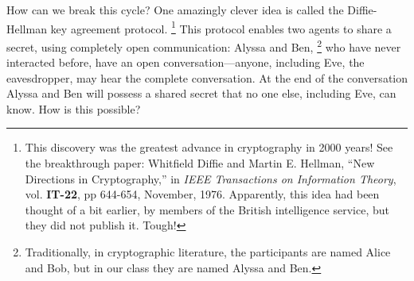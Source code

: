 How can we break this cycle? One amazingly clever idea is called the
Diffie-Hellman key agreement protocol.%
\footnote{This discovery was the greatest advance in cryptography in
  2000 years!  See the breakthrough paper:
  Whitfield Diffie and Martin E. Hellman, ``New Directions in
  Cryptography,'' in {\em IEEE Transactions on Information Theory},
  vol. {\bf IT-22}, pp 644-654, November, 1976.  Apparently, this idea
  had been thought of a bit earlier, by members of the British
  intelligence service, but they did not publish it.  Tough!}
This protocol enables two agents to share a secret, using completely open
communication: Alyssa and Ben,%
\footnote{Traditionally, in cryptographic literature, the participants
  are named Alice and Bob, but in our class they are named Alyssa and Ben.}
who have never interacted before, have
an open conversation---anyone, including Eve, the eavesdropper, may
hear the complete conversation.  At the end of the conversation Alyssa
and Ben will possess a shared secret that no one else, including Eve,
can know.  How is this possible?


